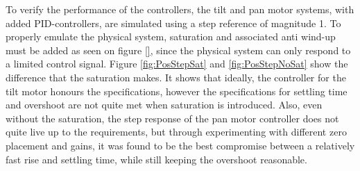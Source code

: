 \documentclass[../../main.tex]{subfiles}
\begin{document}
To verify the performance of the controllers, the tilt and pan motor systems, with added PID-controllers, are simulated using a step reference of magnitude 1. To properly emulate the physical system, saturation and associated anti wind-up must be added as seen on figure \ref{}, since the physical system can only respond to a limited control signal. Figure \ref{fig:PosStepSat} and \ref{fig:PosStepNoSat} show the difference that the saturation makes. It shows that ideally, the controller for the tilt motor honours the specifications, however the specifications for settling time and overshoot are not quite met when saturation is introduced. Also, even without the saturation, the step response of the pan motor controller does not quite live up to the  requirements, but through experimenting with different zero placement and gains, it was found to be the best compromise between a relatively fast rise and settling time, while still keeping the overshoot reasonable.
\end{document}
